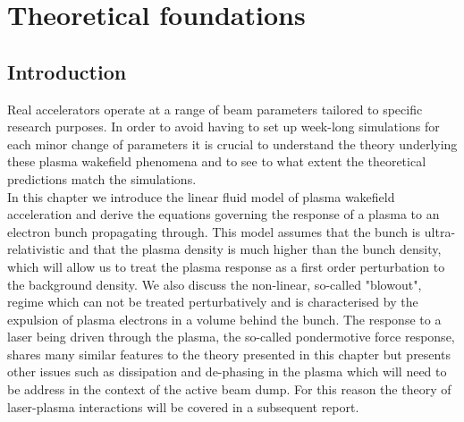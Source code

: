 \chapter{Theoretical foundations}
\section{Introduction}
Real accelerators operate at a range of beam parameters tailored to specific research purposes. In order to avoid having to set up week-long simulations for each minor change of parameters it is crucial to understand the theory underlying these plasma wakefield phenomena and to see to what extent the theoretical predictions match the simulations.\\
\indent In this chapter we introduce the linear fluid model of plasma wakefield acceleration and derive the equations governing the response of a plasma to an electron bunch propagating through. This model assumes that the bunch is ultra-relativistic and that the plasma density is much higher than the bunch density, which will allow us to treat the plasma response as a first order perturbation to the background density.  We also discuss the non-linear, so-called "blowout", regime which can not be treated perturbatively and is characterised by the expulsion of plasma electrons in a volume behind the bunch. The response to a laser being driven through the plasma, the so-called pondermotive force response, shares many similar features to the theory presented in this chapter but presents other issues such as dissipation and de-phasing in the plasma which will need to be address in the context of the active beam dump. For this reason the theory of laser-plasma interactions will be covered in a subsequent report. 
